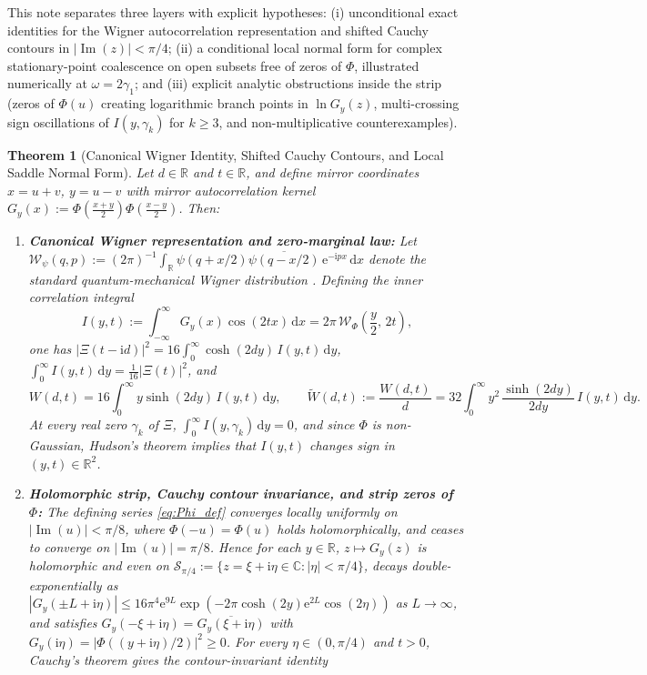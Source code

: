 \documentclass[11pt,a4paper,reqno]{amsart}
\newtheorem{theorem}{Theorem}[section]
\theoremstyle{definition}
\theoremstyle{remark}
\numberwithin{equation}{section}
\newcommand{\dd}{\mathrm{d}}
\newcommand{\ii}{\mathrm{i}}
\newcommand{\ee}{\mathrm{e}}
\newcommand{\Ima}{\operatorname{Im}}
\newcommand{\Wig}{\mathcal{W}}
\newcommand{\Wtil}{\widetilde{W}}
\begin{document}
This note separates three layers with explicit hypotheses: (i) unconditional exact identities for the Wigner autocorrelation representation and shifted Cauchy contours in $|\Ima(z)| < \pi/4$; (ii) a conditional local normal form for complex stationary-point coalescence on open subsets free of zeros of $\Phi$, illustrated numerically at $\omega = 2\gamma_1$; and (iii) explicit analytic obstructions inside the strip (zeros of $\Phi(u)$ creating logarithmic branch points in $\ln G_y(z)$, multi-crossing sign oscillations of $I(y,\gamma_k)$ for $k \ge 3$, and non-multiplicative counterexamples).

\begin{theorem}[Canonical Wigner Identity, Shifted Cauchy Contours, and Local Saddle Normal Form]\label{thm:main}
Let $d \in \mathbb{R}$ and $t \in \mathbb{R}$, and define mirror coordinates $x = u + v$, $y = u - v$ with mirror autocorrelation kernel $G_y(x) := \Phi\!\left(\frac{x+y}{2}\right)\Phi\!\left(\frac{x-y}{2}\right)$. Then:
\begin{enumerate}
\item[\textup{(i)}] \textbf{Canonical Wigner representation and zero-marginal law:} Let $\Wig_\psi(q,p) := (2\pi)^{-1}\int_{\mathbb{R}} \psi(q+x/2)\overline{\psi(q-x/2)}\,\ee^{-\ii p x}\,\dd x$ denote the standard quantum-mechanical Wigner distribution \cite{Wigner1932,Hudson1974}. Defining the inner correlation integral
\begin{equation}\label{eq:Wigner_thm}
I(y,t) := \int_{-\infty}^\infty G_y(x)\cos(2t x)\,\dd x = 2\pi\,\Wig_\Phi\!\left(\frac{y}{2},\, 2t\right),
\end{equation}
one has $|\Xi(t-\ii d)|^2 = 16\int_0^\infty \cosh(2d y)\,I(y,t)\,\dd y$, $\int_0^\infty I(y,t)\,\dd y = \frac{1}{16}|\Xi(t)|^2$, and
\begin{equation}\label{eq:W_mirror_thm}
W(d,t) = 16\int_0^\infty y\sinh(2d y)\,I(y,t)\,\dd y, \qquad \Wtil(d,t) := \frac{W(d,t)}{d} = 32\int_0^\infty y^2\,\frac{\sinh(2d y)}{2d y}\,I(y,t)\,\dd y.
\end{equation}
At every real zero $\gamma_k$ of $\Xi$, $\int_0^\infty I(y,\gamma_k)\,\dd y = 0$, and since $\Phi$ is non-Gaussian, Hudson's theorem \cite{Hudson1974} implies that $I(y,t)$ changes sign in $(y,t) \in \mathbb{R}^2$.
\item[\textup{(ii)}] \textbf{Holomorphic strip, Cauchy contour invariance, and strip zeros of $\Phi$:} The defining series \eqref{eq:Phi_def} converges locally uniformly on $|\Ima(u)| < \pi/8$, where $\Phi(-u) = \Phi(u)$ holds holomorphically, and ceases to converge on $|\Ima(u)| = \pi/8$. Hence for each $y \in \mathbb{R}$, $z \mapsto G_y(z)$ is holomorphic and even on $\mathcal{S}_{\pi/4} := \{z = \xi + \ii\eta \in \mathbb{C} : |\eta| < \pi/4\}$, decays double-exponentially as $|G_y(\pm L + \ii\eta)| \le 16\pi^4\ee^{9L}\exp(-2\pi\cosh(2y)\ee^{2L}\cos(2\eta))$ as $L \to \infty$, and satisfies $G_y(-\xi+\ii\eta) = \overline{G_y(\xi+\ii\eta)}$ with $G_y(\ii\eta) = |\Phi((y+\ii\eta)/2)|^2 \ge 0$. For every $\eta \in (0,\pi/4)$ and $t > 0$, Cauchy's theorem gives the contour-invariant identity

\end{enumerate}
\end{theorem}
\end{document}
